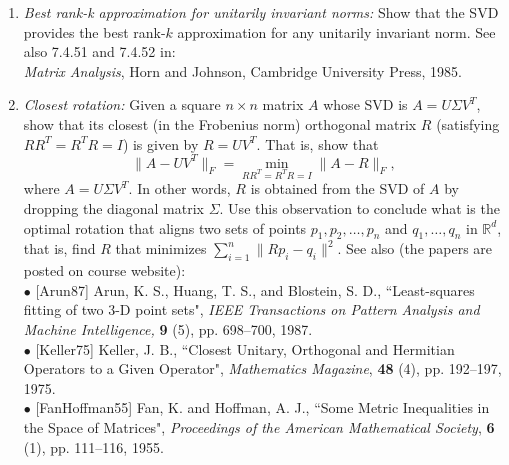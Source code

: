 \documentclass[11pt]{article}
\begin{document}
\begin{enumerate}
\begin{enumerate}
\item {\em Best rank-k approximation for unitarily invariant norms:} Show that the SVD provides the best rank-$k$ approximation for any unitarily invariant norm. See also 7.4.51 and 7.4.52 in: \\
{\em Matrix Analysis}, Horn and Johnson, Cambridge University Press, 1985.

\item {\em Closest rotation:} Given a square $n\times n$ matrix $A$ whose SVD is $A=U\Sigma V^T$, show that its closest (in the Frobenius norm) orthogonal matrix $R$ (satisfying $RR^T=R^TR=I$) is given by $R=UV^T$. That is, show that 
    $$\|A - UV^T\|_F = \min_{RR^T=R^TR=I} \|A-R\|_F,$$ where
    $A=U\Sigma V^T$.   
    In other words, $R$ is obtained from the SVD of $A$ by dropping the diagonal matrix $\Sigma$. Use this observation to conclude what is the optimal rotation that aligns two sets of points $p_1,p_2,\ldots,p_n$ and $q_1,\ldots,q_n$ in $\mathbb{R}^d$, that is, find $R$ that minimizes $\sum_{i=1}^n \|Rp_i-q_i\|^2$. See also (the papers are posted on course website):\\
    
    $\bullet$ [Arun87] Arun, K. S., Huang, T. S., and Blostein, S. D., ``Least-squares fitting of two 3-D point sets", {\em IEEE Transactions on Pattern Analysis and Machine Intelligence,} {\bf 9} (5), pp. 698--700, 1987.\\
    
    $\bullet$ [Keller75] Keller, J. B., ``Closest Unitary, Orthogonal and Hermitian Operators to a Given Operator", {\em Mathematics Magazine}, {\bf 48} (4), pp. 192--197, 1975.\\
    
    $\bullet$ [FanHoffman55] Fan, K. and Hoffman, A. J., ``Some Metric Inequalities in the Space of Matrices",
     {\em Proceedings of the American Mathematical Society},
     {\bf 6} (1), pp. 111--116, 1955.
  
    
    
\end{enumerate}



\end{enumerate}
\end{document}
